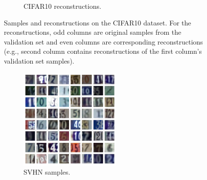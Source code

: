 \documentclass{article}
\newcommand{\figureHeight}{5cm}
\begin{document}
\begin{figure}[p]
\begin{subfigure}[t]{0.49\textwidth}
        \caption{\label{fig:cifar10_reconstructions} CIFAR10
          reconstructions.}
    \end{subfigure}
    \caption{\label{fig:cifar10_images} Samples and reconstructions on the
        CIFAR10 dataset. For the reconstructions, odd columns are
        original samples from the validation set and even columns are
        corresponding reconstructions (e.g., second column contains
        reconstructions of the first column's validation set samples).}
\end{figure}

\begin{figure}[p]
    \centering
    \begin{subfigure}[t]{0.49\textwidth}
        \centering
        \includegraphics[height=\figureHeight]{svhn_samples.png}
        \caption{\label{fig:svhn_samples} SVHN samples.}
    \end{subfigure}
    \hfill
    \begin{subfigure}[t]{0.49\textwidth}
        \centering

\end{subfigure}
\end{figure}
\end{document}

